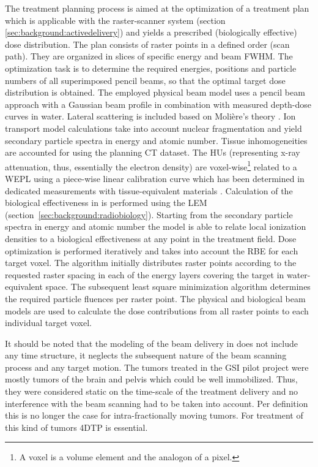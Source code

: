 The treatment planning process is aimed at the optimization of a
treatment plan which is applicable with the raster-scanner system
(section \ref{sec:background:activedelivery}) and yields a prescribed
(biologically effective) dose distribution. The plan consists of
raster points in a defined order (scan path). They are organized in
slices of specific energy and beam \ac{FWHM}. The optimization task is
to determine the required energies, positions and particle numbers of
all superimposed pencil beams, so that the optimal target dose
distribution is obtained.  The employed physical beam model uses a
pencil beam approach with a Gaussian beam profile in combination with
measured depth-dose curves in water. Lateral scattering is included
based on Moli\`ere's theory \citep{Moliere1948}. Ion transport model
calculations take into account nuclear fragmentation and yield
secondary particle spectra in energy and atomic number. Tissue
inhomogeneities are accounted for using the planning \ac{CT}
dataset. The \acp{HU} (representing x-ray attenuation, thus,
essentially the electron density) are voxel-wise\footnote{A voxel is
  a volume element and the \thrD analogon of a pixel.} related to a
\ac{WEPL} using a piece-wise linear calibration curve which has been
determined in dedicated measurements with tissue-equivalent materials
\citep{Geiss1999,Jaekel2001,Rietzel2007}.  Calculation of the
biological effectiveness in \TRiPNE is performed using the \acl{LEM}
(section~\ref{sec:background:radiobiology}). Starting from the
secondary particle spectra in energy and atomic number the model is
able to relate local ionization densities to a biological
effectiveness at any point in the treatment field. Dose optimization
is performed iteratively and takes into account the \ac{RBE} for each
target voxel. The algorithm initially distributes raster points
according to the requested raster spacing in each of the energy layers
covering the target in water-equivalent space. The subsequent least
square minimization algorithm determines the required particle
fluences per raster point. The physical and biological beam models are
used to calculate the dose contributions from all raster points to
each individual target voxel.

It should be noted that the modeling of the beam delivery in \TRiPNE
does not include any time structure, \ie it neglects the subsequent
nature of the beam scanning process and any target motion. The tumors
treated in the \ac{GSI} pilot project were mostly tumors of the brain
and pelvis which could be well immobilized. Thus, they were considered
static on the time-scale of the treatment delivery and no interference
with the beam scanning had to be taken into account. Per definition
this is no longer the case for intra-fractionally moving tumors. For
treatment of this kind of tumors \ac{4DTP} is essential.



